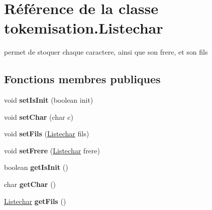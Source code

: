 \hypertarget{classtokemisation_1_1_listechar}{}\section{Référence de la classe tokemisation.\+Listechar}
\label{classtokemisation_1_1_listechar}


permet de stoquer chaque caractere, ainsi que son frere, et son fils  


\subsection*{Fonctions membres publiques}
\begin{DoxyCompactItemize}
\item 
void {\bfseries set\+Is\+Init} (boolean init)\hypertarget{classtokemisation_1_1_listechar_a7bcc4b46efebbe8117f625685a6d95b8}{}\label{classtokemisation_1_1_listechar_a7bcc4b46efebbe8117f625685a6d95b8}

\item 
void {\bfseries set\+Char} (char c)\hypertarget{classtokemisation_1_1_listechar_ae9f093e05f4bb4ecb0204fd08d7bf9d3}{}\label{classtokemisation_1_1_listechar_ae9f093e05f4bb4ecb0204fd08d7bf9d3}

\item 
void {\bfseries set\+Fils} (\hyperlink{classtokemisation_1_1_listechar}{Listechar} fils)\hypertarget{classtokemisation_1_1_listechar_af6f52f861756f43b6e4241e2fbc09110}{}\label{classtokemisation_1_1_listechar_af6f52f861756f43b6e4241e2fbc09110}

\item 
void {\bfseries set\+Frere} (\hyperlink{classtokemisation_1_1_listechar}{Listechar} frere)\hypertarget{classtokemisation_1_1_listechar_ae98806e1c440fc4e77641996ac01e666}{}\label{classtokemisation_1_1_listechar_ae98806e1c440fc4e77641996ac01e666}

\item 
boolean {\bfseries get\+Is\+Init} ()\hypertarget{classtokemisation_1_1_listechar_aaf529076c50565da487289b1c4fe753a}{}\label{classtokemisation_1_1_listechar_aaf529076c50565da487289b1c4fe753a}

\item 
char {\bfseries get\+Char} ()\hypertarget{classtokemisation_1_1_listechar_aa819fd8ead7a8e2d905561b3cd366a38}{}\label{classtokemisation_1_1_listechar_aa819fd8ead7a8e2d905561b3cd366a38}

\item 
\hyperlink{classtokemisation_1_1_listechar}{Listechar} {\bfseries get\+Fils} ()\hypertarget{classtokemisation_1_1_listechar_a143c64ece7dcb6acf0bf0e2e5d6b5809}{}\label{classtokemisation_1_1_listechar_a143c64ece7dcb6acf0bf0e2e5d6b5809}


\end{DoxyCompactItemize}
